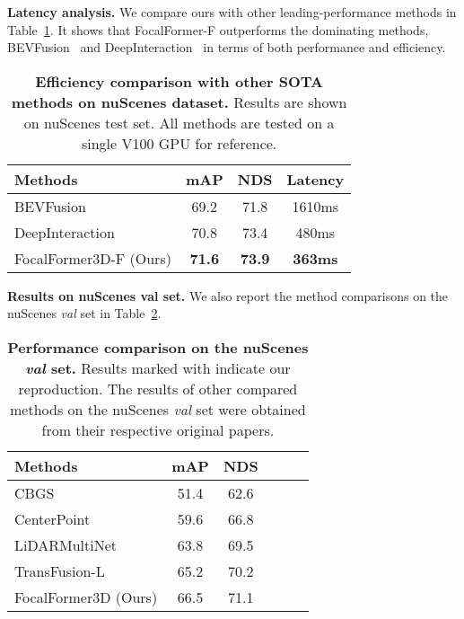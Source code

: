 \documentclass[10pt,twocolumn,letterpaper]{article}
\begin{document}
\vspace{2mm}
\noindent\textbf{Latency analysis.}
We compare ours with other leading-performance methods in Table~\ref{tab:latency}. It shows that FocalFormer-F outperforms the dominating methods, BEVFusion~\cite{bevfusion} and DeepInteraction~\cite{deepinteraction} in terms of both performance and efficiency.

\begin{table}[h]
	\begin{center}
\begin{tabular}{lccc}
		\toprule
		  Methods & mAP & NDS & Latency \\ \midrule
            BEVFusion~\cite{bevfusion} & 69.2 & 71.8 & 1610ms \\
            DeepInteraction~\cite{deepinteraction} &  70.8 & 73.4 & 480ms \\
            FocalFormer3D-F (Ours) & \textbf{71.6} & \textbf{73.9} & \textbf{363ms} \\ 
		\bottomrule
		\end{tabular}
	\end{center}
	\caption{\textbf{Efficiency comparison with other SOTA methods on nuScenes dataset.} Results are shown on nuScenes test set. All methods are tested on a single V100 GPU for reference.}\label{tab:latency}
\end{table}


\vspace{2mm}
\noindent\textbf{Results on nuScenes val set.}
We also report the method comparisons on the nuScenes \textit{val} set in Table~\ref{tab:nuscenes val result}. 

\begin{table}[h]
	\begin{center}
\begin{tabular}{lccccc}
		\toprule
		  Methods & mAP & NDS  \\ \midrule
            CBGS~\cite{cbgs} & 51.4 & 62.6 \\
            CenterPoint~\cite{centerpoint} & 59.6 & 66.8 \\
            LiDARMultiNet~\cite{ye2022lidarmultinet} & 63.8 & 69.5 \\
            TransFusion-L~\cite{transfusion} & 65.2 & 70.2 \\ 
            FocalFormer3D (Ours) & 66.5 & 71.1 \\
            \bottomrule
		\end{tabular}
	\end{center}
	\caption{\textbf{Performance comparison on the nuScenes \textit{val} set.} Results marked with  indicate our reproduction. The results of other compared methods on the nuScenes \textit{val} set were obtained from their respective original papers.}\label{tab:nuscenes val result}
\end{table}
\end{document}
